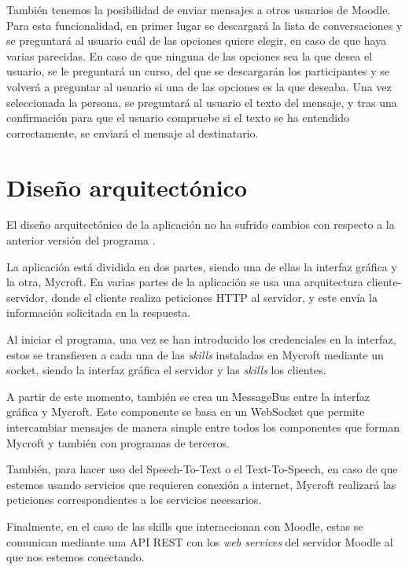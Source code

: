 
También tenemos la posibilidad de enviar mensajes a otros usuarios de Moodle. Para esta funcionalidad, en primer lugar se descargará la lista de conversaciones y se preguntará al usuario cuál de las opciones quiere elegir, en caso de que haya varias parecidas. En caso de que ninguna de las opciones sea la que desea el usuario, se le preguntará un curso, del que se descargarán los participantes y se volverá a preguntar al usuario si una de las opciones es la que deseaba. Una vez seleccionada la persona, se preguntará al usuario el texto del mensaje, y tras una confirmación para que el usuario compruebe si el texto se ha entendido correctamente, se enviará el mensaje al destinatario.


\section{Diseño arquitectónico}
El diseño arquitectónico de la aplicación no ha sufrido cambios con respecto a la anterior versión del programa \cite{versionanterior}.

La aplicación está dividida en dos partes, siendo una de ellas la interfaz gráfica y la otra, Mycroft. En varias partes de la aplicación se usa una arquitectura cliente-servidor, donde el cliente realiza peticiones HTTP al servidor, y este envía la información solicitada en la respuesta.

Al iniciar el programa, una vez se han introducido los credenciales en la interfaz, estos se transfieren a cada una de las \textit{skills} instaladas en Mycroft mediante un socket, siendo la interfaz gráfica el servidor y las \textit{skills} los clientes.

A partir de este momento, también se crea un MessageBus entre la interfaz gráfica y Mycroft. Este componente se basa en un WebSocket que permite intercambiar mensajes de manera simple entre todos los componentes que forman Mycroft y también con programas de terceros.

También, para hacer uso del Speech-To-Text o el Text-To-Speech, en caso de que estemos usando servicios que requieren conexión a internet, Mycroft realizará las peticiones correspondientes a los servicios necesarios.

Finalmente, en el caso de las skills que interaccionan con Moodle, estas se comunican mediante una API REST con los \textit{web services} del servidor Moodle al que nos estemos conectando.

